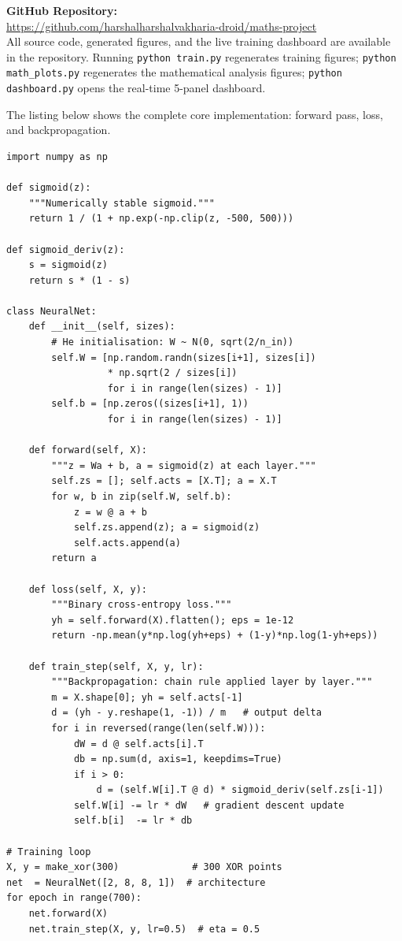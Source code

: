 \documentclass[12pt,a4paper]{article}
\begin{document}
\noindent\textbf{GitHub Repository:}\\
\url{https://github.com/harshalharshalvakharia-droid/maths-project}\\[0.3cm]
\noindent All source code, generated figures, and the live training dashboard are available in the repository. Running \texttt{python train.py} regenerates training figures; \texttt{python math\_plots.py} regenerates the mathematical analysis figures; \texttt{python dashboard.py} opens the real-time 5-panel dashboard.

\vspace{0.4cm}
\noindent The listing below shows the complete core implementation: forward pass, loss, and backpropagation.

\begin{lstlisting}[caption={Core neural network --- forward pass and backpropagation (train.py)}]
import numpy as np

def sigmoid(z):
    """Numerically stable sigmoid."""
    return 1 / (1 + np.exp(-np.clip(z, -500, 500)))

def sigmoid_deriv(z):
    s = sigmoid(z)
    return s * (1 - s)

class NeuralNet:
    def __init__(self, sizes):
        # He initialisation: W ~ N(0, sqrt(2/n_in))
        self.W = [np.random.randn(sizes[i+1], sizes[i])
                  * np.sqrt(2 / sizes[i])
                  for i in range(len(sizes) - 1)]
        self.b = [np.zeros((sizes[i+1], 1))
                  for i in range(len(sizes) - 1)]

    def forward(self, X):
        """z = Wa + b, a = sigmoid(z) at each layer."""
        self.zs = []; self.acts = [X.T]; a = X.T
        for w, b in zip(self.W, self.b):
            z = w @ a + b
            self.zs.append(z); a = sigmoid(z)
            self.acts.append(a)
        return a

    def loss(self, X, y):
        """Binary cross-entropy loss."""
        yh = self.forward(X).flatten(); eps = 1e-12
        return -np.mean(y*np.log(yh+eps) + (1-y)*np.log(1-yh+eps))

    def train_step(self, X, y, lr):
        """Backpropagation: chain rule applied layer by layer."""
        m = X.shape[0]; yh = self.acts[-1]
        d = (yh - y.reshape(1, -1)) / m   # output delta
        for i in reversed(range(len(self.W))):
            dW = d @ self.acts[i].T
            db = np.sum(d, axis=1, keepdims=True)
            if i > 0:
                d = (self.W[i].T @ d) * sigmoid_deriv(self.zs[i-1])
            self.W[i] -= lr * dW   # gradient descent update
            self.b[i]  -= lr * db

# Training loop
X, y = make_xor(300)             # 300 XOR points
net  = NeuralNet([2, 8, 8, 1])  # architecture
for epoch in range(700):
    net.forward(X)
    net.train_step(X, y, lr=0.5)  # eta = 0.5
\end{lstlisting}
\end{document}
